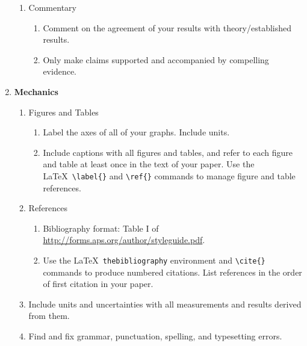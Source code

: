 \documentclass[11 pt]{article}
\begin{document}
\begin{enumerate}
\begin{enumerate}
  \item Commentary
    \begin{enumerate}
    \item Comment on the agreement of your results with
      theory/established results.

    \item Only make claims supported and accompanied by compelling
      evidence.
    \end{enumerate}

  \end{enumerate}

\item \textbf{Mechanics}
  \begin{enumerate}
  \item Figures and Tables
    \begin{enumerate}
    \item Label the axes of all of your graphs. Include units.

    \item Include captions with all figures and tables, and refer to
      each figure and table at least once in the text of your
      paper. Use the \LaTeX\ \verb+\label{}+ and \verb+\ref{}+
      commands to manage figure and table references.

    \end{enumerate}

  \item References 
    \begin{enumerate}
    \item Bibliography format: Table I of 
      \url{http://forms.aps.org/author/styleguide.pdf}.

    \item Use the \LaTeX\ \verb+thebibliography+ environment and
      \verb+\cite{}+ commands to produce numbered citations. List
      references in the order of first citation in your paper.
    \end{enumerate}

  \item Include units and uncertainties with all measurements and
    results derived from them.

  \item Find and fix grammar, punctuation, spelling, and typesetting
    errors.

  \end{enumerate}

\end{enumerate}
\end{document}
